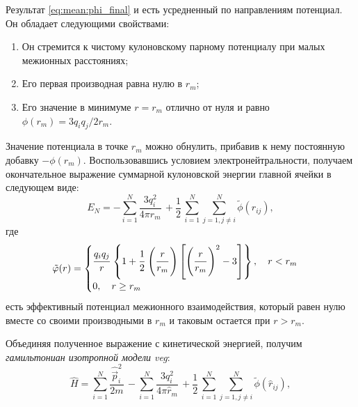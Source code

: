 Результат \eqref{eq:mean:phi_final} и есть усредненный по направлениям потенциал.
Он обладает следующими свойствами:
\begin{enumerate}
    \item Он стремится к чистому кулоновскому парному потенциалу при малых межионных расстояниях;
    \item Его первая производная равна нулю в $r_{m}$;
    \item Его значение в минимуме $r = r_m$ отлично от нуля и равно $\phi (r_m ) = 3 q_i q_j / 2 r_m$.
\end{enumerate}

Значение потенциала в точке $r_m$ можно обнулить, прибавив к нему постоянную добавку $-\phi (r_m)$.
Воспользовавшись условием электронейтральности, получаем окончательное выражение суммарной кулоновской энергии главной ячейки в следующем виде:
\begin{equation}
    \label{eq:mean:E_coloumb_main-cell_final}
    E_N = - \sum\limits_{i=1}^{N} \frac{3q_{i}^2}{4\pi r_m}\, + \frac{1}{2}\, \sum\limits_{i=1}^{N} \sum\limits_{j=1, j \neq i}^{N} \tilde{\phi} (r_{ij}),
\end{equation}
где
\begin{equation}
    \label{eq:mean:phi_tilde}
    \tilde{\phi} (r) =
    \begin{cases}
        \cfrac{q_i q_j}{r}\, \left\{ 1 + \cfrac{1}{2}\, \left( \cfrac{r}{r_m}\,  \right) \left[ \left(\cfrac{r}{r_m}\,   \right)^2 - 3 \right] \right\}, \quad r < r_m \\
        0, \quad r \geq r_m
    \end{cases}
\end{equation}
есть эффективный потенциал межионного взаимодействия, который равен нулю вместе со своими производными в $r_m$ и таковым остается при $r > r_m$.

Объединяя полученное выражение с кинетической энергией, получим \textit{гамильтониан изотропной модели \acrshort{veg}}:
\begin{equation}
    \label{eq:mean:ham_final}
    \hat{H} = \sum\limits_{i=1}^{N} \frac{\hat{\vec{p}}_{i}^2}{2m}\, - \sum\limits_{i=1}^{N} \frac{3q_{i}^2}{4\pi \hat{r}_m}\, + \frac{1}{2}\, \sum\limits_{i=1}^{N} \sum\limits_{j=1, j \neq i}^{N} \tilde{\phi} (\hat{r}_{ij}),
\end{equation}

